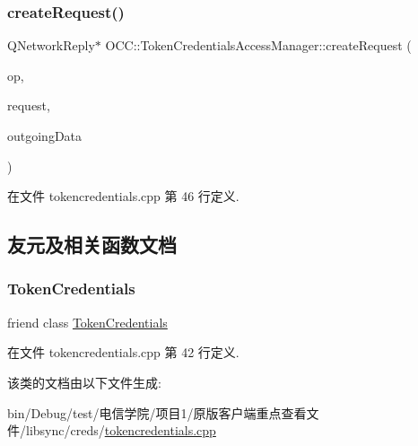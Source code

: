 \subsubsection{\texorpdfstring{create\+Request()}{createRequest()}}
{\footnotesize\ttfamily Q\+Network\+Reply$\ast$ O\+C\+C\+::\+Token\+Credentials\+Access\+Manager\+::create\+Request (\begin{DoxyParamCaption}\item[{Operation}]{op,  }\item[{const Q\+Network\+Request \&}]{request,  }\item[{Q\+I\+O\+Device $\ast$}]{outgoing\+Data }\end{DoxyParamCaption})\hspace{0.3cm}{\ttfamily [protected]}}



在文件 tokencredentials.\+cpp 第 46 行定义.



\subsection{友元及相关函数文档}
\mbox{\label{class_o_c_c_1_1_token_credentials_access_manager_a6ed8b3b5b5b5a9472b9bb5600a47b904}} 
\subsubsection{\texorpdfstring{Token\+Credentials}{TokenCredentials}}
{\footnotesize\ttfamily friend class \hyperlink{class_o_c_c_1_1_token_credentials}{Token\+Credentials}\hspace{0.3cm}{\ttfamily [friend]}}



在文件 tokencredentials.\+cpp 第 42 行定义.



该类的文档由以下文件生成\+:\begin{DoxyCompactItemize}
\item 
bin/\+Debug/test/电信学院/项目1/原版客户端重点查看文件/libsync/creds/\hyperlink{tokencredentials_8cpp}{tokencredentials.\+cpp}\end{DoxyCompactItemize}
